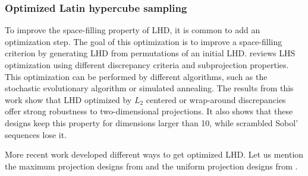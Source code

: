 \subsubsection{Optimized Latin hypercube sampling}
To improve the space-filling property of LHD, it is common to add an optimization step. 
The goal of this optimization is to improve a space-filling criterion by generating LHD from permutations of an initial LHD.
\citet{damblin_couplet_2013} reviews LHS optimization using different discrepancy criteria and subprojection properties.
This optimization can be performed by different algorithms, such as the stochastic evolutionary algorithm or simulated annealing.
The results from this work show that LHD optimized by $L_2$ centered or wrap-around discrepancies offer strong robustness to two-dimensional projections.
It also shows that these designs keep this property for dimensions larger than 10, while scrambled Sobol' sequences lose it. 

More recent work developed different ways to get optimized LHD. 
Let us mention the maximum projection designs from \citet{joseph_gul_2015} and the uniform projection designs from \citet{sun_2019}.

